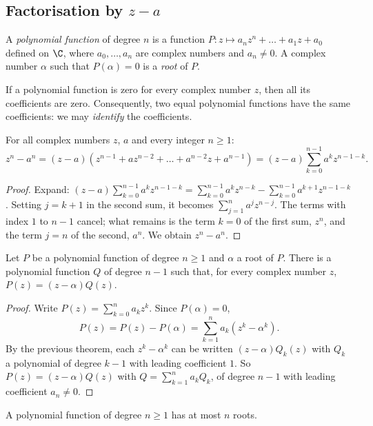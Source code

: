 \subsection{Factorisation by $z-a$}
\begin{definition}
A \emph{polynomial function} of degree $n$ is a function $P:z\mapsto a_nz^n+\dots+a_1z+a_0$ defined on $\C$, where $a_0,\dots,a_n$ are complex numbers and $a_n\neq0$. A complex number $\alpha$ such that $P(\alpha)=0$ is a \emph{root} of $P$.
\end{definition}
\begin{keypoint}
If a polynomial function is zero for every complex number $z$, then all its coefficients are zero. Consequently, two equal polynomial functions have the same coefficients: we may \emph{identify} the coefficients.
\end{keypoint}
\begin{theorem}[Factorisation of $z^n-a^n$]
For all complex numbers $z$, $a$ and every integer $n\ge1$:
\[z^n-a^n=(z-a)\left(z^{n-1}+az^{n-2}+\dots+a^{n-2}z+a^{n-1}\right)=(z-a)\sum_{k=0}^{n-1}a^kz^{n-1-k}.\]
\end{theorem}
\begin{proof}
Expand: $(z-a)\sum_{k=0}^{n-1}a^kz^{n-1-k}=\sum_{k=0}^{n-1}a^kz^{n-k}-\sum_{k=0}^{n-1}a^{k+1}z^{n-1-k}$. Setting $j=k+1$ in the second sum, it becomes $\sum_{j=1}^{n}a^jz^{n-j}$. The terms with index $1$ to $n-1$ cancel; what remains is the term $k=0$ of the first sum, $z^n$, and the term $j=n$ of the second, $a^n$. We obtain $z^n-a^n$.
\end{proof}
\begin{theorem}
Let $P$ be a polynomial function of degree $n\ge1$ and $\alpha$ a root of $P$. There is a polynomial function $Q$ of degree $n-1$ such that, for every complex number $z$, $P(z)=(z-\alpha)Q(z)$.
\end{theorem}
\begin{proof}
Write $P(z)=\sum_{k=0}^{n}a_kz^k$. Since $P(\alpha)=0$,
\[P(z)=P(z)-P(\alpha)=\sum_{k=1}^{n}a_k\left(z^k-\alpha^k\right).\]
By the previous theorem, each $z^k-\alpha^k$ can be written $(z-\alpha)Q_k(z)$ with $Q_k$ a polynomial of degree $k-1$ with leading coefficient $1$. So $P(z)=(z-\alpha)Q(z)$ with $Q=\sum_{k=1}^na_kQ_k$, of degree $n-1$ with leading coefficient $a_n\neq0$.
\end{proof}
\begin{theorem}
A polynomial function of degree $n\ge1$ has at most $n$ roots.
\end{theorem}
